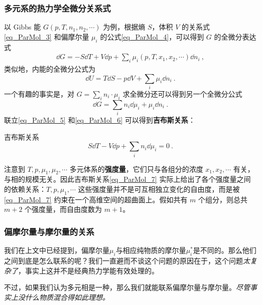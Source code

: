 \subsubsection{多元系的热力学全微分关系式}
以 Gibbs 能 $G(p,T,n_1,n_2,\cdots)$ 为例，根据熵 $S$，体积 $V$ 的关系式\autoref{eq_ParMol_3} 和偏摩尔量 $\mu_i$ 的公式\autoref{eq_ParMol_4}，可以得到 $G$ 的全微分表达式
\begin{equation}\label{eq_ParMol_5}
\begin{aligned}
\dd G=-S\dd T+V\dd p+\sum_i \mu_i(p,T,x_1,x_2,\cdots) \dd n_i~,
\end{aligned}
\end{equation}
类似地，内能的全微分公式为
\begin{equation}
\dd U=T\dd S-p\dd V+\sum_i \mu_i\dd n_i~.
\end{equation}
一个有趣的事实是，对 $G=\sum_i n_i\cdot \mu_i$ 求全微分还可以得到另一个全微分公式
\begin{equation}\label{eq_ParMol_6}
\dd G=\sum_i n_i \dd \mu_i + \mu_i \dd n_i~.
\end{equation}
联立\autoref{eq_ParMol_5} 和\autoref{eq_ParMol_6} 可以得到\textbf{吉布斯关系}：
\begin{theorem}{吉布斯关系}
\begin{equation}\label{eq_ParMol_7}
S\dd T-V\dd p+\sum_i n_i\dd \mu_i=0~.
\end{equation}
\end{theorem}
注意到 $T,p,\mu_1,\mu_2,\cdots$ 多元体系的\textbf{强度量}，它们只与各组分的浓度 $x_1,x_2,\cdots $ 有关，与相的规模无关。因此吉布斯关系\autoref{eq_ParMol_7} 实际上给出了各个强度量之间的依赖关系：$T,p,\mu_1,\cdots$ 这些强度量并不是可互相独立变化的自由度，而是被\autoref{eq_ParMol_7} 约束在一个高维空间的超曲面上。假如共有 $m$ 个组分，则总共 $m+2$ 个强度量，而自由度数为 $m+1$。

\subsubsection{偏摩尔量与摩尔量的关系}
我们在上文中已经提到，偏摩尔量$\mu_i$与相应纯物质的摩尔量$\mu_i^*$是不同的。那么他们之间到底是怎么联系的呢？我们一直避而不谈这个问题的原因在于，这个问题\textsl{太复杂了}，事实上这并不是经典热力学能有效处理的。

不过，如果我们认为多元相是一种，那么我们就能联系偏摩尔量与摩尔量。\textsl{尽管事实上没什么物质混合得如此理想。}
